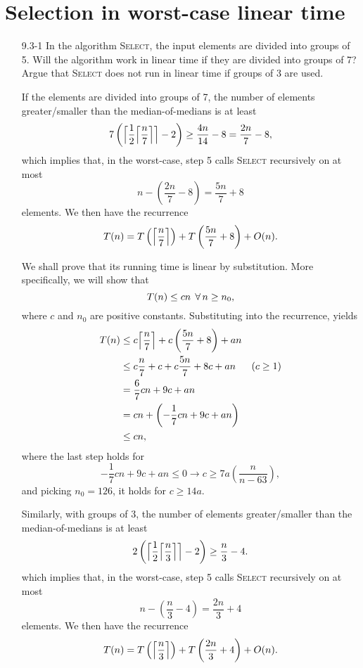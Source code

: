 \newpage

\section{Selection in worst-case linear time}

\begin{enumerate}

\item[9.3-1]{In the algorithm \textsc{Select}, the input elements are divided
into groups of 5. Will the algorithm work in linear time if they are divided
into groups of 7? Argue that \textsc{Select} does not run in linear time if
groups of 3 are used.}

\begin{framed}
If the elements are divided into groups of 7, the number of elements
greater/smaller than the median-of-medians is at least
\[
  7 \left( \Bigl\lceil \frac{1}{2} \Bigl\lceil \frac{n}{7} \Bigr\rceil \Bigr\rceil - 2 \right)
  \ge \frac{4n}{14} - 8 = \frac{2n}{7} - 8,
\]
which implies that, in the worst-case, step 5 calls \textsc{Select} recursively
on at most
\[
  n - \left( \frac{2n}{7} - 8 \right) = \frac{5n}{7} + 8
\]
elements. We then have the recurrence
\[
  T(n) = T\left( \Bigl\lceil \frac{n}{7} \Bigr\rceil \right) + T\left( \frac{5n}{7} + 8 \right) + O(n).
\]

We shall prove that its running time is linear by substitution. More
specifically, we will show that
\[
    T(n) \le cn \; \operatorname{\forall} n \ge n_0,
\]
where $c$ and $n_0$ are positive constants. Substituting into the recurrence,
yields
\begin{equation*}
\begin{aligned}
  T(n) &\le c \Bigl\lceil \frac{n}{7} \Bigr\rceil + c \left( \frac{5n}{7} + 8 \right) + an\\
       &\le c \frac{n}{7} + c + c \frac{5n}{7} + 8c + an & \text{($c \ge 1$)}\\
       &=   \frac{6}{7} cn + 9c + an\\
       &=   cn + \left( - \frac{1}{7} cn + 9c + an \right)\\
       &\le cn,
\end{aligned}
\end{equation*}
where the last step holds for
\[
  -\frac{1}{7} cn + 9c + an \le 0 \rightarrow c \ge 7a \left(\frac{n}{n - 63}\right),
\]
and picking $n_0 = 126$, it holds for $c \ge 14a$.

Similarly, with groups of 3, the number of elements greater/smaller than the
median-of-medians is at least
\[
  2 \left( \Bigl\lceil \frac{1}{2} \Bigl\lceil \frac{n}{3} \Bigr\rceil \Bigr\rceil - 2 \right)
  \ge \frac{n}{3} - 4.
\]
which implies that, in the worst-case, step 5 calls \textsc{Select} recursively
on at most
\[
  n - \left( \frac{n}{3} - 4 \right) = \frac{2n}{3} + 4
\]
elements. We then have the recurrence
\[
  T(n) = T\left( \Bigl\lceil \frac{n}{3} \Bigr\rceil \right) + T\left( \frac{2n}{3} + 4 \right) + O(n).
\]


\end{framed}
\end{enumerate}
